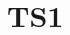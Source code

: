 \documentclass{article}
\begin{document}
\section*{TS1}

\begin{multicols}{3}


\TEST{\textcapitalcompwordmark}
\TEST{\textascendercompwordmark}
\TEST{\textquotestraightbase}
\TEST{\textquotestraightdblbase}
\TEST{\texttwelveudash}
\TEST{\textthreequartersemdash}
\TEST{\textleftarrow}
\TEST{\textrightarrow}
\TEST{\textblank}
\TEST{\textdollar}
\TEST{\textquotesingle}
\TEST{\textasteriskcentered}
\TEST{\textdblhyphen}
\TEST{\textfractionsolidus}
\TEST{\textzerooldstyle}
\TEST{\textoneoldstyle}
\TEST{\texttwooldstyle}
\TEST{\textthreeoldstyle}
\TEST{\textfouroldstyle}
\TEST{\textfiveoldstyle}
\TEST{\textsixoldstyle}
\TEST{\textsevenoldstyle}
\TEST{\texteightoldstyle}
\TEST{\textnineoldstyle}
\TEST{\textlangle}
\TEST{\textminus}
\TEST{\textrangle}
\TEST{\textmho}
\TEST{\textbigcircle}
\TEST{\textohm}
\TEST{\textlbrackdbl}
\TEST{\textrbrackdbl}
\TEST{\textuparrow}
\TEST{\textdownarrow}
\TEST{\textasciigrave}
\TEST{\textborn}
\TEST{\textdivorced}
\TEST{\textdied}
\TEST{\textleaf}
\TEST{\textmarried}
\TEST{\textmusicalnote}
\TEST{\texttildelow}
\TEST{\textdblhyphenchar}
\TEST{\textasciibreve}
\TEST{\textasciicaron}
\TEST{\textacutedbl}
\TEST{\textgravedbl}
\TEST{\textdagger}
\TEST{\textdaggerdbl}
\TEST{\textbardbl}
\TEST{\textperthousand}
\TEST{\textbullet}
\TEST{\textcelsius}
\TEST{\textdollaroldstyle}
\TEST{\textcentoldstyle}
\TEST{\textflorin}
\TEST{\textcolonmonetary}
\TEST{\textwon}
\TEST{\textnaira}
\TEST{\textguarani}
\TEST{\textpeso}
\TEST{\textlira}
\TEST{\textrecipe}
\TEST{\textinterrobang}
\TEST{\textinterrobangdown}
\TEST{\textdong}
\TEST{\texttrademark}
\TEST{\textpertenthousand}
\TEST{\textpilcrow}
\TEST{\textbaht}
\TEST{\textnumero}
\TEST{\textdiscount}
\TEST{\textestimated}
\TEST{\textopenbullet}
\TEST{\textservicemark}
\TEST{\textlquill}
\TEST{\textrquill}
\TEST{\textcent}
\TEST{\textsterling}
\TEST{\textcurrency}
\TEST{\textyen}
\TEST{\textbrokenbar}
\TEST{\textsection}
\TEST{\textasciidieresis}
\TEST{\textcopyright}
\TEST{\textordfeminine}
\TEST{\textcopyleft}
\TEST{\textlnot}
\TEST{\textcircledP}
\TEST{\textregistered}
\TEST{\textasciimacron}
\TEST{\textdegree}
\TEST{\textpm}
\TEST{\texttwosuperior}
\TEST{\textthreesuperior}
\TEST{\textasciiacute}
\TEST{\textmu}
\TEST{\textparagraph}
\TEST{\textperiodcentered}
\TEST{\textreferencemark}
\TEST{\textonesuperior}
\TEST{\textordmasculine}
\TEST{\textsurd}
\TEST{\textonequarter}
\TEST{\textonehalf}
\TEST{\textthreequarters}
\TEST{\texteuro}
\TEST{\texttimes}
\TEST{\textdiv}

\end{multicols}
\end{document}
